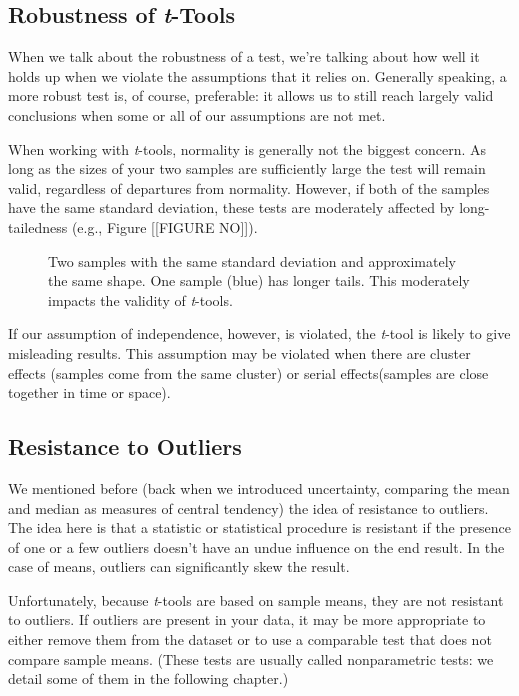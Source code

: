 \subsection{Robustness of \textit{t}-Tools}

When we talk about the robustness of a test, we're talking about how well it holds up when we violate the assumptions that it relies on. Generally speaking, a more robust test is, of course, preferable: it allows us to still reach largely valid conclusions when some or all of our assumptions are not met.

When working with \textit{t}-tools, normality is generally not the biggest concern. As long as the sizes of your two samples are sufficiently large the test will remain valid, regardless of departures from normality. However, if both of the samples have the same standard deviation, these tests are moderately affected by long-tailedness (e.g., Figure [[FIGURE NO]]).

\begin{figure}[h]
\caption{Two samples with the same standard deviation and approximately the same shape. One sample (blue) has longer tails. This moderately impacts the validity of \textit{t}-tools.}
\end{figure} 

If our assumption of independence, however, is violated, the \textit{t}-tool is likely to give misleading results. This assumption may be violated when there are cluster effects (samples come from the same cluster) or serial effects(samples are close together in time or space). 

\subsection{Resistance to Outliers}

We mentioned before (back when we introduced uncertainty, comparing the mean and median as measures of central tendency) the idea of resistance to outliers. The idea here is that a statistic or statistical procedure is resistant if the presence of one or a few outliers doesn't have an undue influence on the end result. In the case of means, outliers can significantly skew the result.

Unfortunately, because \textit{t}-tools are based on sample means, they are not resistant to outliers. If outliers are present in your data, it may be more appropriate to either remove them from the dataset or to use a comparable test that does not compare sample means. (These tests are usually called nonparametric tests: we detail some of them in the following chapter.)

